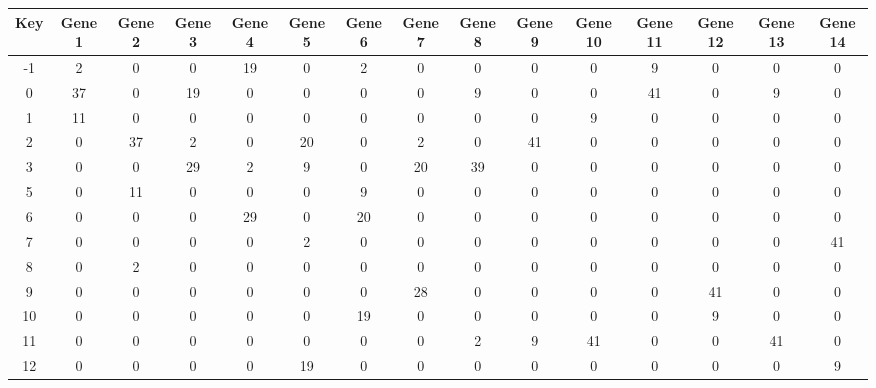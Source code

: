 \begin{tabular}{|c|c|c|c|c|c|c|c|c|c|c|c|c|c|c|}
\hline
Key & Gene 1 & Gene 2 & Gene 3 & Gene 4 & Gene 5 & Gene 6 & Gene 7 & Gene 8 & Gene 9 & Gene 10 & Gene 11 & Gene 12 & Gene 13 & Gene 14 \\
\hline
-1 & 2 & 0 & 0 & 19 & 0 & 2 & 0 & 0 & 0 & 0 & 9 & 0 & 0 & 0 \\
0 & 37 & 0 & 19 & 0 & 0 & 0 & 0 & 9 & 0 & 0 & 41 & 0 & 9 & 0 \\
1 & 11 & 0 & 0 & 0 & 0 & 0 & 0 & 0 & 0 & 9 & 0 & 0 & 0 & 0 \\
2 & 0 & 37 & 2 & 0 & 20 & 0 & 2 & 0 & 41 & 0 & 0 & 0 & 0 & 0 \\
3 & 0 & 0 & 29 & 2 & 9 & 0 & 20 & 39 & 0 & 0 & 0 & 0 & 0 & 0 \\
5 & 0 & 11 & 0 & 0 & 0 & 9 & 0 & 0 & 0 & 0 & 0 & 0 & 0 & 0 \\
6 & 0 & 0 & 0 & 29 & 0 & 20 & 0 & 0 & 0 & 0 & 0 & 0 & 0 & 0 \\
7 & 0 & 0 & 0 & 0 & 2 & 0 & 0 & 0 & 0 & 0 & 0 & 0 & 0 & 41 \\
8 & 0 & 2 & 0 & 0 & 0 & 0 & 0 & 0 & 0 & 0 & 0 & 0 & 0 & 0 \\
9 & 0 & 0 & 0 & 0 & 0 & 0 & 28 & 0 & 0 & 0 & 0 & 41 & 0 & 0 \\
10 & 0 & 0 & 0 & 0 & 0 & 19 & 0 & 0 & 0 & 0 & 0 & 9 & 0 & 0 \\
11 & 0 & 0 & 0 & 0 & 0 & 0 & 0 & 2 & 9 & 41 & 0 & 0 & 41 & 0 \\
12 & 0 & 0 & 0 & 0 & 19 & 0 & 0 & 0 & 0 & 0 & 0 & 0 & 0 & 9 \\
\hline
\end{tabular}